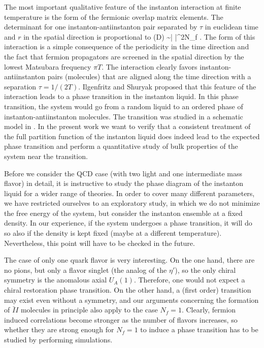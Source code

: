     The most important qualitative feature of the instanton interaction
at finite temperature is the form of the fermionic overlap matrix
elements. The determinant for one instanton-antiinstanton pair
separated by $\tau$ in euclidean time and $r$ in the spatial direction
is proportional to
\be
\label{detD}
  \det(\hat D) \sim \left| 
                    \right|^{2N_f} .
\ee
The form of this interaction is a simple consequence of the periodicity
in the time direction and the fact that fermion propagators are screened
in the spatial direction by the lowest Matsubara frequency $\pi T$.
The interaction clearly favors instanton-antiinstanton pairs (molecules)
that are aligned along the time direction with a separation $\tau=1/(2T)$.
Ilgenfritz and Shuryak \cite{IS_94} proposed that this feature of the
interaction leads to a phase transition in the instanton liquid. In
this phase transition, the system would go from a random liquid to an
ordered phase of instanton-antiinstanton molecules. The transition
was studied in a schematic model in \cite{IS_94,SSV_95}. In the present
work we want to verify that a consistent treatment of the full
partition function of the instanton liquid does indeed lead to the
expected phase transition and perform a quantitative study of bulk
properties of the system near the transition.

    Before we consider the QCD case (with two light and one intermediate
mass flavor) in detail, it is instructive to study the phase diagram of
the instanton liquid for a wider range of theories. In order to cover
many different parameters, we have restricted ourselves to an exploratory
study, in which we do not minimize the free energy of the system, but
consider the instanton ensemble at a fixed density. In our experience,
if the system undergoes a phase transition, it will do so also if the
density is kept fixed (maybe at a different temperature). Nevertheless,
this point will have to be checked in the future.

   The case of only one quark flavor is very interesting. On the one hand,
there are no pions, but only a flavor singlet (the analog of the $\eta'$),
so the only chiral symmetry is the anomalous axial $U_A(1)$. Therefore,
one would not expect a chiral restoration phase transition. On the other
hand, a (first order) transition may exist even without a symmetry, and
our arguments concerning the formation of $\bar I I$ molecules in principle
also apply to the case $N_f=1$. Clearly, fermion induced correlations
become stronger as the number of flavors increases, so whether they are
strong enough for $N_f=1$ to induce a phase transition has to be studied
by performing simulations.

